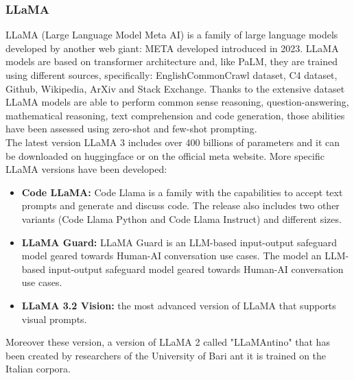 \subsubsection{LLaMA}
LLaMA (Large Language Model Meta AI) is a family of large language models developed by another web giant: META developed introduced in 2023. LLaMA models are based on transformer architecture and, like PaLM, they are trained using different sources, specifically: EnglishCommonCrawl dataset, C4 dataset, Github, Wikipedia, ArXiv and Stack Exchange.  Thanks to the extensive dataset LLaMA models are able to perform common sense reasoning, question-answering, mathematical reasoning, text comprehension and code generation, those abilities have been assessed using zero-shot and few-shot prompting. \cite{touvron2023llama}\\The latest version LLaMA 3 includes over 400 billions of parameters\cite{llama3_intro} and it can be downloaded on huggingface or on the official meta website. More specific LLaMA versions have been developed:
\begin{itemize}
    \item \textbf{Code LLaMA:} Code Llama is a family with the capabilities to accept text prompts and generate and discuss code. The release also includes two other variants (Code Llama Python and Code Llama Instruct) and different sizes.
    \item \textbf{LLaMA Guard:} LLaMA Guard is an LLM-based input-output safeguard model geared towards Human-AI conversation use cases. The model an LLM-based input-output safeguard model geared towards Human-AI conversation use cases.
    \item \textbf{LLaMA 3.2 Vision:} the most advanced version of LLaMA that supports visual prompts.
\end{itemize}
Moreover these version, a version of LLaMA 2 called "LLaMAntino"\cite{basile2023llamantino} that has been created by researchers of the University of Bari ant it is trained on the Italian corpora.
